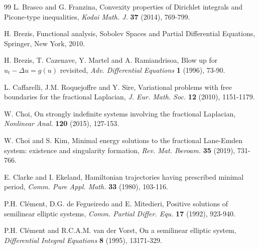 \documentclass[10pt]{article}
\numberwithin{equation}{section}
\numberwithin{equation}{section}
\begin{document}
\begin{thebibliography}{99}
 L. Brasco and G. Franzina, Convexity properties of Dirichlet integrals and Picone-type inequalities, {\it Kodai Math. J.} {\bf 37} (2014), 769-799.

 H. Brezis, Functional analysis, Sobolev Spaces and Partial Differential Equations, Springer, New York, 2010.

 H. Brezis, T. Cazenave, Y. Martel and A. Ramiandrisoa, Blow up for $u_t-\Delta u=g(u)$ revisited, {\it Adv. Differential Equations} {\bf 1} (1996), 73-90.





 L. Caffarelli, J.M. Roquejoffre and Y. Sire, Variational problems with free boundaries for the fractional Laplacian, {\it J. Eur. Math. Soc.} {\bf 12} (2010), 1151-1179.


 W. Choi, On strongly indefinite systems involving the fractional Laplacian, {\it Nonlinear Anal.} {\bf 120} (2015), 127-153.

 W. Choi and S. Kim, Minimal energy solutions to the fractional Lane-Emden system: existence and singularity formation, {\it Rev. Mat. Iberoam.} {\bf 35} (2019), 731-766.

 E. Clarke and I. Ekeland, Hamiltonian trajectories having prescribed minimal period, {\it Comm. Pure Appl. Math.} {\bf 33} (1980), 103-116.

 P.H. Cl\'ement, D.G. de Fegueiredo and E. Mitedieri, Positive solutions of semilinear elliptic systems, {\it Comm. Partial Differ. Equ.} {\bf 17} (1992), 923-940.


 P.H. Cl\'ement and  R.C.A.M. van der Vorst, On a semilinear elliptic system, {\it Differential Integral Equations} {\bf 8} (1995), 13171-329.



\end{thebibliography}
\end{document}
